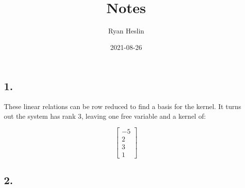 \documentclass[
]{article}
\title{Notes}
\author{Ryan Heslin}
\date{2021-08-26}
\begin{document}
\maketitle

\newcommand{\abcd}{\begin{bmatrix}a&b\\
c&d\end{bmatrix}}

\newcommand{\m}[1]{\begin{bmatrix}#1\end{bmatrix}}

\newcommand{\vect}[1]{\begin{pmatrix}#1\end{pmatrix}}

\newcommand{\meq}[1]{\begin{split}#1\end{split}}

\newcommand{\bym}[1]{#1\times{m}}

\newcommand{\nby}[1]{n\times{#1}}

\newcommand{\subsp}[2]{\Bigg\{\begin{bmatrix}#1\end{bmatrix}:#2\Bigg\}}

\newcommand{\proj}[2]{\text{proj}_#1(#2)}

\newcommand{\refl}[2]{\text{refl}_#1(#2)}

\newcommand{\sumn}{\sum_{i=1}^n}

\newcommand{\dotsn}[5]{#1_{1}#3_{1}#5{#1}_{2}#3_{2}{#5}\dots{#5}#1_{#2}#3_{#4}}

\hypertarget{section}{%
\subsection{1.}\label{section}}

These linear relations can be row reduced to find a basis for the
kernel. It turns out the system has rank 3, leaving one free variable
and a kernel of:

\[
  \begin{bmatrix}
  -5\\
  2\\
  3\\
  1
  \end{bmatrix}
\]

\hypertarget{section-1}{%
\subsection{2.}\label{section-1}}
\end{document}
